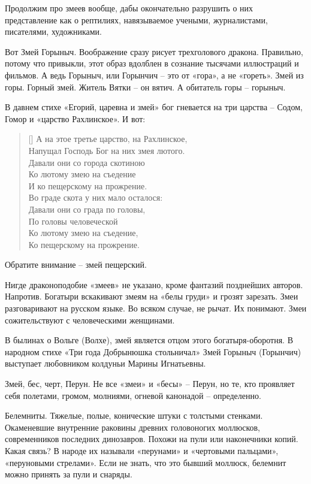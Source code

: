 Продолжим про змеев вообще, дабы окончательно разрушить о них представление как о рептилиях, навязываемое учеными, журналистами, писателями, художниками.

Вот Змей Горыныч. Воображение сразу рисует трехголового дракона. Правильно, потому что привыкли, этот образ вдолблен в сознание тысячами иллюстраций и фильмов. А ведь Горыныч, или Горынчич – это от «гора», а не «гореть». Змей из горы. Горный змей. Житель Вятки – он вятич. А обитатель горы – горыныч.

В давнем стихе «Егорий, царевна и змей» бог гневается на три царства – Содом, Гомор и «царство Рахлинское». И вот:

\settowidth{\versewidth}{Напущал Господь Бог на них змея лютого.} 
\begin{verse}[\versewidth]
А на этое третье царство, на Рахлинское,\\
Напущал Господь Бог на них змея лютого.\\
Давали они со города скотиною\\
Ко лютому змею на съедение\\
И ко пещерскому на прожрение.\\
Во граде скота у них мало осталося:\\
Давали они со града по головы,\\
По головы человеческой\\
Ко лютому змею на съедение,\\
Ко пещерскому на прожрение.
\end{verse}

Обратите внимание – змей пещерский. 

Нигде драконоподобие «змеев» не указано, кроме фантазий позднейших авторов. Напротив. Богатыри вскакивают змеям на «белы груди» и грозят зарезать. Змеи разговаривают на русском языке. Во всяком случае, не рычат. Их понимают. Змеи сожительствуют с человеческими женщинами.

В былинах о Вольге (Волхе), змей является отцом этого богатыря-оборотня. В народном стихе «Три года Добрынюшка стольничал» Змей Горыныч (Горынчич) выступает любовником колдуньи Марины Игнатьевны.

Змей, бес, черт, Перун. Не все «змеи» и «бесы» – Перун, но те, кто проявляет себя полетами, громом, молниями, огневой канонадой – определенно. 

Белемниты. Тяжелые, полые, конические штуки с толстыми стенками. Окаменевшие внутренние раковины древних головоногих моллюсков, современников последних динозавров. Похожи на пули или наконечники копий. Какая связь? В народе их называли «перунами» и «чертовыми пальцами», «перуновыми стрелами». Если не знать, что это бывший моллюск, белемнит можно принять за пули и снаряды.

